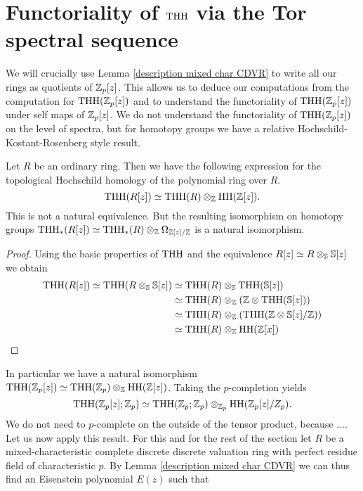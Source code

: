 \section{Functoriality of $\THH$ via the Tor spectral sequence}
We will crucially use Lemma \ref{description mixed char CDVR} to write all our rings as quotients of $\Z_p[z]$. This allows us to deduce our computations from the computation for $\THH(\Z_p[z])$ and to understand the functoriality of $\THH(\Z_p[z])$ under self maps of $\Z_p[z]$. We do not understand the functoriality of $\THH(\Z_p[z])$ on the level of spectra, but for homotopy groups we have a relative Hochschild-Kostant-Rosenberg style result.
\begin{lem}
    Let $R$ be an ordinary ring. Then we have the following expression for the topological Hochschild homology of the polynomial ring over $R$.
    \begin{equation*}
        \THH(R[z])\simeq \THH(R)\otimes_\Z \HH(\Z[z]).
    \end{equation*}
    This is not a natural equivalence. But the resulting isomorphism on homotopy groups $\THH_*(R[z])\simeq \THH_*(R)\otimes_\Z \Omega_{\Z[z]/\Z}$ is a natural isomorphism.
\end{lem}
\begin{proof} Using the basic properties of $\THH$ and the equivalence $R[z]\simeq R\otimes_\S \S[z]$ we obtain
    \begin{align*}
        \THH(R[z])\simeq \THH(R\otimes_\S \S[z])&\simeq\THH(R)\otimes_\S \THH(\S[z]) \\
        &\simeq \THH(R)\otimes_\Z (\Z\otimes \THH(\S[z])) \\
        &\simeq\THH(R)\otimes_\Z (\THH(\Z\otimes \S[z]/\Z))\\
        &\simeq 
         \THH(R)\otimes_\Z \HH(\Z[x])
    \end{align*}
\end{proof}
In particular we have a natural isomorphism $\THH(\Z_p[z])\simeq \THH(\Z_p)\otimes_\Z \HH(\Z[z])$. Taking the $p$-completion yields 
\begin{equation*}
    \THH(\Z_p[z];\Z_p)\simeq \THH(\Z_p;\Z_p)\otimes_{\Z_p} \HH(\Z_p[z]/Z_p).
\end{equation*} 
We do not need to $p$-complete on the outside of the tensor product, because ....\\
Let us now apply this result. For this and for the rest of the section let $R$ be a mixed-characteristic complete discrete discrete valuation ring with perfect residue field of characteristic $p$. By Lemma \ref{description mixed char CDVR} we can thus find an Eisenstein polynomial $E(z)$ such that

